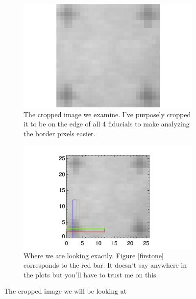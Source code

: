 \documentclass[10pt]{article}
\begin{document}
\begin{figure}[!h]
    \centering 
    \begin{subfigure}[b]{.45\linewidth}
        \centering
        \includegraphics[width=1.3\textwidth]{../plots_tables_images/datcrop.png}
        \caption{The cropped image we examine. I've purposely cropped it to be on the edge of all 4 fiducials to make analyzing the border pixels easier. }
    \end{subfigure}
    \hspace{.5in}
    \begin{subfigure}[b]{.45\linewidth}
        \centering
        \includegraphics[width=1.5\textwidth]{../plots_tables_images/datcrop_color.png}
        \caption{Where we are looking exactly. Figure \ref{firstone} corresponds to the red bar. It doesn't say anywhere in the plots but you'll have to trust me on this.}
    \end{subfigure}
    \caption{The cropped image we will be looking at}
    \label{datcrop}
\end{figure}
\end{document}
